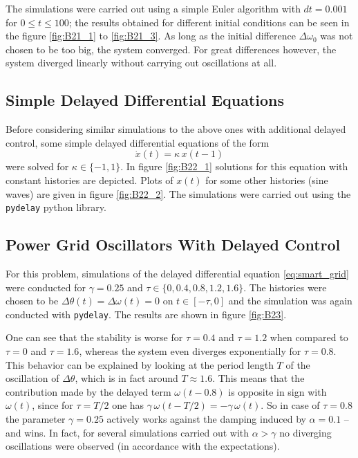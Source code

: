 \documentclass{scrartcl}
\begin{document}
The simulations were carried out using a simple Euler algorithm with
$dt=0.001$ for $0 \le t \le 100$; the results obtained for different
initial conditions can be seen in the figure \ref{fig:B21_1} to \ref{fig:B21_3}.
As long as the initial difference $\Delta\omega_0$ was not chosen to be too
big, the system converged. For great differences however, the system
diverged linearly without carrying out oscillations at all.


\subsection{Simple Delayed Differential Equations}
Before considering similar simulations to the above ones with additional
delayed control, some simple delayed differential equations of the form
\begin{equation}\label{eq:simple_dde}
    \dot{x}(t) = \kappa\,x(t - 1)
\end{equation}
were solved for $\kappa\in\{-1, 1\}$. In figure \ref{fig:B22_1} solutions
for this equation with constant histories are depicted. Plots of $x(t)$
for some other histories (sine waves) are given in figure \ref{fig:B22_2}.
The simulations were carried out using the \texttt{pydelay} python library.

\subsection{Power Grid Oscillators With Delayed Control}
For this problem, simulations of the delayed differential equation
\eqref{eq:smart_grid} were conducted for $\gamma = 0.25$ and $\tau\in\{0, 0.4,
0.8, 1.2, 1.6\}$. The histories were chosen to be $\Delta\theta(t)
= \Delta\omega(t) = 0$ on $t\in[-\tau, 0]$ and the simulation was again
conducted with \texttt{pydelay}. The results are shown in figure
\ref{fig:B23}.

One can see that the stability is worse for $\tau=0.4$ and $\tau=1.2$ when
compared to $\tau=0$ and $\tau=1.6$, whereas the system even diverges
exponentially for $\tau = 0.8$. This behavior can be explained by looking
at the period length $T$ of the oscillation of $\Delta\theta$, which is in
fact around $T \approx 1.6$. This means that the contribution made
by the delayed term $\omega(t - 0.8)$ is opposite in sign with
$\omega(t)$, since for $\tau = T/2$ one has $\gamma\,\omega(t - T/2)
= -\gamma\,\omega(t)$. So in case of $\tau = 0.8$ the parameter $\gamma=0.25$
actively works against the damping induced by $\alpha=0.1$ -- and wins. In
fact, for several simulations carried out with $\alpha > \gamma$ no
diverging oscillations were observed (in accordance with the expectations).
\end{document}
